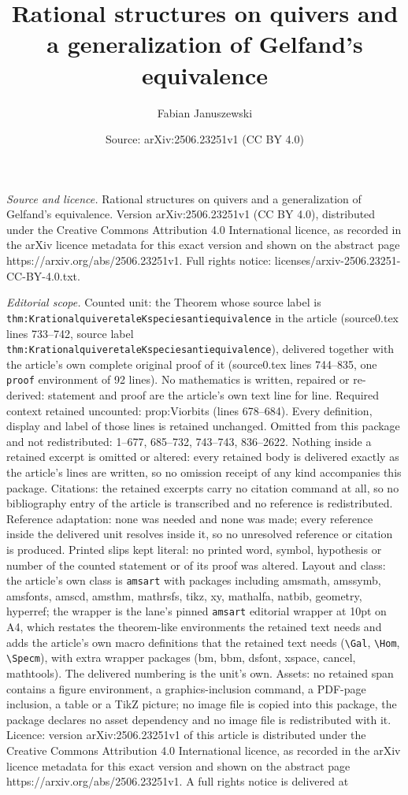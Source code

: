 \documentclass[10pt,a4paper]{amsart}
\title[Rational structures on quivers and a generalization of Gelfa]{Rational structures on quivers and a generalization of Gelfand's equivalence}
\author{Fabian Januszewski}
\date{Source: arXiv:2506.23251v1 (CC BY 4.0)}
\begin{document}
\maketitle

\noindent\emph{Source and licence.} Rational structures on quivers and a generalization of Gelfand's equivalence. Version arXiv:2506.23251v1 (CC BY 4.0), distributed under the Creative Commons Attribution 4.0 International licence, as recorded in the arXiv licence metadata for this exact version and shown on the abstract page https://arxiv.org/abs/2506.23251v1. Full rights notice: licenses/arxiv-2506.23251-CC-BY-4.0.txt.\par\smallskip

\noindent\textit{Editorial scope.} Counted unit: the Theorem whose source label is \texttt{thm:KrationalquiveretaleKspeciesantiequivalence} in the article (source0.tex lines 733--742, source label \texttt{thm:KrationalquiveretaleKspeciesantiequivalence}), delivered together with the article's own complete original proof of it (source0.tex lines 744--835, one \texttt{proof} environment of 92 lines). No mathematics is written, repaired or re-derived: statement and proof are the article's own text line for line. Required context retained uncounted: prop:Viorbits (lines 678--684). Every definition, display and label of those lines is retained unchanged. Omitted from this package and not redistributed: 1--677, 685--732, 743--743, 836--2622. Nothing inside a retained excerpt is omitted or altered: every retained body is delivered exactly as the article's lines are written, so no omission receipt of any kind accompanies this package. Citations: the retained excerpts carry no citation command at all, so no bibliography entry of the article is transcribed and no reference is redistributed. Reference adaptation: none was needed and none was made; every reference inside the delivered unit resolves inside it, so no unresolved reference or citation is produced. Printed slips kept literal: no printed word, symbol, hypothesis or number of the counted statement or of its proof was altered. Layout and class: the article's own class is \texttt{amsart} with packages including amsmath, amssymb, amsfonts, amscd, amsthm, mathrsfs, tikz, xy, mathalfa, natbib, geometry, hyperref; the wrapper is the lane's pinned \texttt{amsart} editorial wrapper at 10pt on A4, which restates the theorem-like environments the retained text needs and adds the article's own macro definitions that the retained text needs (\texttt{\textbackslash Gal}, \texttt{\textbackslash Hom}, \texttt{\textbackslash Specm}), with extra wrapper packages (bm, bbm, dsfont, xspace, cancel, mathtools). The delivered numbering is the unit's own. Assets: no retained span contains a figure environment, a graphics-inclusion command, a PDF-page inclusion, a table or a TikZ picture; no image file is copied into this package, the package declares no asset dependency and no image file is redistributed with it. Licence: version arXiv:2506.23251v1 of this article is distributed under the Creative Commons Attribution 4.0 International licence, as recorded in the arXiv licence metadata for this exact version and shown on the abstract page https://arxiv.org/abs/2506.23251v1. A full rights notice is delivered at 
\end{document}

